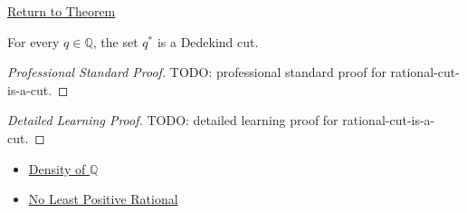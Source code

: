 \newpage
{}
\label{prf:rational-cut-is-a-cut}

\begin{remark*}[Return]
\hyperref[lem:rational-cut-is-a-cut]{Return to Theorem}
\end{remark*}

\begin{lemma*}
For every $q\in\mathbb{Q}$, the set $q^{\ast}$ is a Dedekind cut.
\end{lemma*}

\begin{proof}[Professional Standard Proof]
\LRAProofBodyStart
TODO: professional standard proof for rational-cut-is-a-cut.
\end{proof}

\begin{proof}[Detailed Learning Proof]
\LRAProofBodyStart
TODO: detailed learning proof for rational-cut-is-a-cut.
\end{proof}

\begin{remark*}
\end{remark*}

\begin{dependencies}
\begin{itemize}
  \item \hyperref[thm:density-of-q]{Density of $\mathbb{Q}$}
  \item \hyperref[prop:no-least-positive-rational]{No Least Positive Rational}
\end{itemize}
\end{dependencies}

\clearpage
